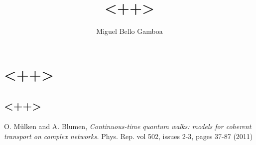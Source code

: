 \documentclass[11pt,a4paper]{article}
\begin{document}
\title{<++>}
\author{Miguel Bello Gamboa}
\maketitle


\section{<++>}
\subsection{<++>}


\clearpage
\begin{thebibliography}{4}
 
 O. M\"ulken and A. Blumen,
 \textit{Continuous-time quantum walks: models for coherent transport on complex networks.}
 Phys. Rep. vol 502, issues 2-3, pages 37-87 (2011)
 
\end{thebibliography} 
\end{document}
